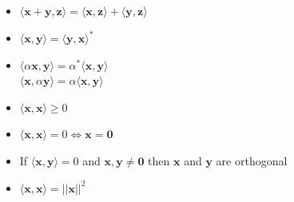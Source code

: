 \documentclass[11pt,a4paper]{article}
\begin{document}
\begin{itemize}[font=\bfseries\uline]
\begin{multicols}{2}
\begin{itemize}
            \item $\langle\mathbf{x}+\mathbf{y},\mathbf{z}\rangle = \langle\mathbf{x},\mathbf{z}\rangle + \langle\mathbf{y},\mathbf{z}\rangle$
            \item $\langle\mathbf{x},\mathbf{y}\rangle = \langle\mathbf{y},\mathbf{x}\rangle^*$
            \item $\langle\alpha\mathbf{x},\mathbf{y}\rangle = \alpha^*\langle\mathbf{x},\mathbf{y}\rangle$\\
            $\langle\mathbf{x},\alpha\mathbf{y}\rangle = \alpha\langle\mathbf{x},\mathbf{y}\rangle$
            \item $\langle\mathbf{x},\mathbf{x}\rangle \geq 0$
            \item $\langle\mathbf{x},\mathbf{x}\rangle = 0 \iff \mathbf{x} = \mathbf{0}$
            \item If $\langle\mathbf{x},\mathbf{y}\rangle = 0$ and $\mathbf{x,y} \neq \mathbf{0}$ then $\mathbf{x}$ and $\mathbf{y}$ are orthogonal
            \item $\langle\mathbf{x},\mathbf{x}\rangle = ||\mathbf{x}||^2$
\end{itemize}
\end{multicols}
\end{itemize}
\end{document}
